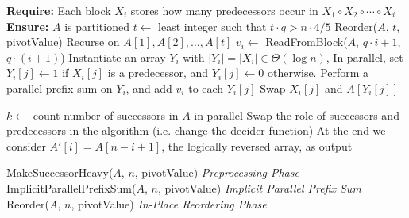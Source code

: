 \documentclass[a4paper,UKenglish,cleveref, autoref, thm-restate]{lipics-v2019}
\begin{document}
\begin{figure*}
\begin{algorithmic}
  \State \textbf{Require: } Each block $X_i$ stores how many predecessors occur in $X_1 \circ X_2 \circ \cdots \circ X_i$
  \State \textbf{Ensure: }  $A$ is partitioned
      \State $t \gets $ least integer such that $t\cdot q > n\cdot 4/5$
      \State Reorder($A$, $t$, pivotValue)
      \Comment Recurse on $A[1], A[2], \ldots, A[t]$
      \State $v_i \gets$ ReadFromBlock($A$, $q\cdot i+1$, $q\cdot(i+1)$) 
        \State Instantiate an array $Y_i$ with $|Y_i| = |X_i| \in \Theta(\log n)$, 
        \State In parallel, set $Y_i[j] \gets 1$ if $X_i[j]$ is a predecessor, and $Y_i[j] \gets 0$ otherwise.
        \State Perform a parallel prefix sum on $Y_i$, and add $v_i$ to each $Y_i[j]$
            \State Swap $X_i[j]$ and $A[Y_i[j]]$
          \EndIf
        \EndFor
      \EndFor
    \EndProcedure
    \State

      \State $k \gets$ count number of successors in $A$ in parallel
        \State Swap the role of successors and predecessors in the algorithm (i.e. change the decider function)
        \State At the end we consider $A'[i] = A[n-i+1]$, the logically reversed array, as output
      \EndIf

      \State MakeSuccessorHeavy($A$, $n$, pivotValue) \Comment \emph{Preprocessing Phase}
      \State ImplicitParallelPrefixSum($A$, $n$, pivotValue) \Comment \emph{Implicit Parallel Prefix Sum}
      \State Reorder($A$, $n$, pivotValue) \Comment \emph{In-Place Reordering Phase}
    \EndProcedure
	\end{algorithmic}	
\end{figure*}

\clearpage
\clearpage


\end{document}
